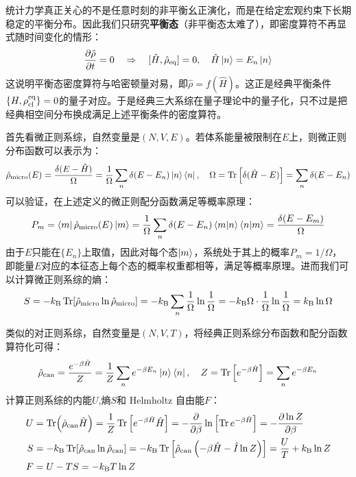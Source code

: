 统计力学真正关心的不是任意时刻的非平衡幺正演化，而是在给定宏观约束下长期稳定的平衡分布。因此我们只研究\textbf{平衡态}（非平衡态太难了），即密度算符不再显式随时间变化的情形：
\[\pdv{\hat{\rho}}{t}=0 \quad \Rightarrow \quad[\hat{H},\hat{\rho}_{\rm eq}]=0, \quad \hat{H}\ket{n}=E_n\ket{n}\]
这说明平衡态密度算符与哈密顿量对易，即$\hat{\rho}=f(\hat{H})$。这正是经典平衡条件$\{H,\rho_{\rm cl}^{\rm eq}\}=0$的量子对应。于是经典三大系综在量子理论中的量子化，只不过是把经典相空间分布换成满足上述平衡条件的密度算符。

\begin{theorem}[量子化的微正则系综]
首先看微正则系综，自然变量是$(N,V,E)$。若体系能量被限制在$E$上，则微正则分布函数可以表示为：
\[\hat{\rho}_{\rm micro}(E)=\frac{\delta(E-\hat{H})}{\Omega}=\frac{1}{\Omega}\sum_n\delta(E-E_n)\ket{n}\bra{n}, \quad \Omega=\Tr\left[\delta(\hat{H}-E)\right]=\sum_n\delta(E-E_n)\]
可以验证，在上述定义的微正则配分函数满足等概率原理：
\[P_m=\bra{m}\hat{\rho}_{\rm micro}(E)\ket{m}=\frac{1}{\Omega}\sum_n\delta(E-E_n)\bra{m}\ket{n}\bra{n}\ket{m}=\frac{\delta(E-E_m)}{\Omega}\]
由于$E$只能在$\{E_n\}$上取值，因此对每个态$\ket{m}$，系统处于其上的概率$P_m=1/\Omega$，即能量$E$对应的本征态上每个态的概率权重都相等，满足等概率原理。进而我们可以计算微正则系综的熵：
\[S=-k_{\rm B}\Tr[\hat{\rho}_{\rm micro}\ln\hat{\rho}_{\rm micro}]=-k_{\rm B}\sum_n\frac{1}{\Omega}\ln\frac{1}{\Omega}=-k_{\rm B}\Omega\cdot\frac{1}{\Omega}\ln\frac{1}{\Omega}=k_{\rm B}\ln\Omega\]
\end{theorem}

\begin{theorem}[量子化的正则系综]
类似的对正则系综，自然变量是$(N,V,T)$，将经典正则系综分布函数和配分函数算符化可得：
\[\hat{\rho}_{\rm can}=\frac{e^{-\beta\hat{H}}}{Z}=\frac{1}{Z}\sum_n e^{-\beta E_n}\ket{n}\bra{n}, \quad Z=\Tr\left[e^{-\beta\hat{H}}\right]=\sum_n e^{-\beta E_n}\]
计算正则系综的内能$U$,熵$S$和 Helmholtz 自由能$F$：
\[\begin{aligned}
U&=\Tr(\hat{\rho}_{\rm can}\hat{H})=\frac{1}{Z}\Tr\left[e^{-\beta\hat{H}}\hat{H}\right]=-\pdv{\beta}\ln\left[\Tr e^{-\beta\hat{H}}\right]=-\pdv{\ln Z}{\beta}\\
S&=-k_{\rm B}\Tr[\hat{\rho}_{\rm can}\ln\hat{\rho}_{\rm can}]=-k_{\rm B}\Tr\left[\hat{\rho}_{\rm can}\left(-\beta\hat{H}-\hat{I}\ln Z\right)\right]=\frac{U}{T}+k_{\rm B}\ln Z\\
F&=U-TS=-k_{\rm B}T\ln Z
\end{aligned}\]
\end{theorem}

